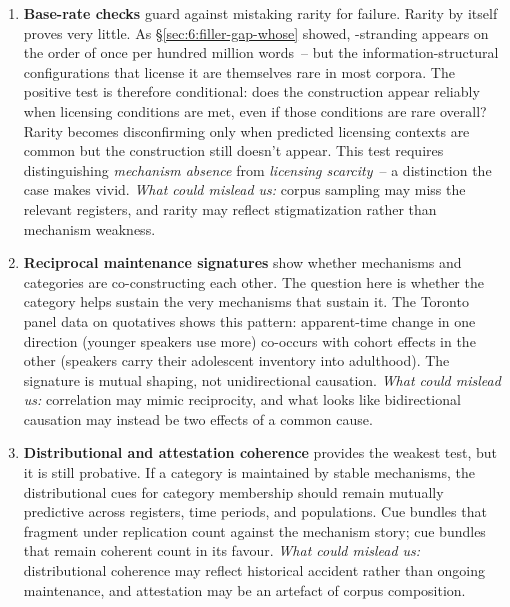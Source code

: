 \begin{enumerate}
\item \textbf{Base-rate checks} guard against mistaking rarity for failure. Rarity by itself proves very little. As §\ref{sec:6:filler-gap-whose} showed, -stranding appears on the order of once per hundred million words~-- but the information-structural configurations that license it are themselves rare in most corpora. The positive test is therefore conditional: does the construction appear reliably when licensing conditions are met, even if those conditions are rare overall? Rarity becomes disconfirming only when predicted licensing contexts are common but the construction still doesn't appear. This test requires distinguishing \emph{mechanism absence} from \emph{licensing scarcity}~-- a distinction the  case makes vivid. \emph{What could mislead us:} corpus sampling may miss the relevant registers, and rarity may reflect stigmatization rather than mechanism weakness.

\item \textbf{Reciprocal maintenance signatures} show whether mechanisms and categories are co-constructing each other. The question here is whether the category helps sustain the very mechanisms that sustain it. The Toronto panel data on quotatives shows this pattern: apparent-time change in one direction (younger speakers use  more) co-occurs with cohort effects in the other (speakers carry their adolescent inventory into adulthood). The signature is mutual shaping, not unidirectional causation. \emph{What could mislead us:} correlation may mimic reciprocity, and what looks like bidirectional causation may instead be two effects of a common cause.

\item \textbf{Distributional and attestation coherence} provides the weakest test, but it is still probative. If a category is maintained by stable mechanisms, the distributional cues for category membership should remain mutually predictive across registers, time periods, and populations. Cue bundles that fragment under replication count against the mechanism story; cue bundles that remain coherent count in its favour. \emph{What could mislead us:} distributional coherence may reflect historical accident rather than ongoing maintenance, and attestation may be an artefact of corpus composition.
\end{enumerate}

